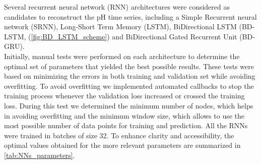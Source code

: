 Several recurrent neural network (RNN) architectures were considered as
candidates to reconstruct the pH time series, including a Simple Recurrent
neural network (SRNN), Long-Short Term Memory (LSTM), BiDirectional LSTM
(BD-LSTM, (\cref{fig:BD_LSTM_scheme}) and BiDirectional Gated Recurrent Unit
(BD-GRU).\\
Initially, manual tests were performed on each architecture to determine
the optimal set of parameters that yielded the best possible results. These
tests were based on minimizing the errors in both training and validation set
while avoiding overfitting. To avoid overfitting we implemented automated
callbacks to stop the training process whenever the validation loss increased
or crossed the training loss. During this test we determined the minimum number
of nodes, which helps in avoiding overfitting and the minimum window size,
which allows to use the most possible number of data points for training and
prediction. All the RNNs were trained in batches of size 32. To enhance clarity
and accessibility, the optimal values obtained for the more relevant parameters
are summarized in \cref{tab:NNs_parameters}.
\begin{table}[H]
    \centering
    \caption{Optimal parameters used for the different RNN architectures}
    \label{tab:NNs_parameters}
\end{table}
